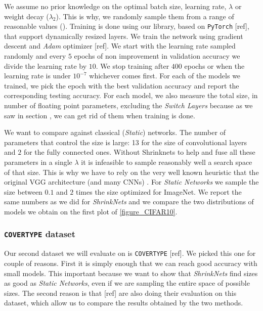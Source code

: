 We assume no prior knowledge on the optimal batch size, learning rate,
$\lambda$ or weight decay ($\lambda_2$). This is why, we randomly sample them
from a range of reasonable values ().
Training is done using our library, based on \texttt{PyTorch} [ref], that
support dynamically resized layers. We train the network using gradient descent
and \textit{Adam} optimizer [ref]. We start with the learning rate sampled
randomly and every $5$ epochs of non improvement in validation accuracy we
divide the learning rate by $10$. We stop training after $400$ epochs or when
the learning rate is under $10^{-7}$ whichever comes first. 
For each of the models we trained, we pick the epoch with the best validation
accuracy and report the corresponding testing accuracy. For each model, we also
measure the total size, in number of floating point parameters, excluding the
\textit{Switch Layers} because as we saw in section , we can
get rid of them when training is done.

We want to compare against classical (\textit{Static}) networks. The number of
parameters that control the size is large: 13 for the size of convolutional
layers and $2$ for the fully connected ones. Without Shrinknets to help and fuse
all these parameters in a single $\lambda$ it is infeasible to sample reasonably
well a search space of that size. This is why we have to rely on the very well
known heuristic that the original VGG architecture (and many CNNs) . For \textit{Static Networks}
we sample the size between $0.1$ and $2$ times the size optimized for ImageNet.
We report the same numbers as we did for \textit{ShrinkNets} and we compare the
two distributions of models we obtain on the first plot of \cref{figure_CIFAR10}.


\subsubsection{\texttt{COVERTYPE} dataset}

Our second dataset we will evaluate on is \texttt{COVERTYPE} [ref].  We picked
this one for couple of reasons. First it is simply enough that we can reach good
accuracy with small models. This important because we want to show that
\textit{ShrinkNets} find sizes as good as \textit{Static Networks}, even if we
are sampling the entire space of possible sizes. The second reason is that [ref]
are also doing their evaluation on this dataset, which allow us to compare the
results obtained by the two methods.

